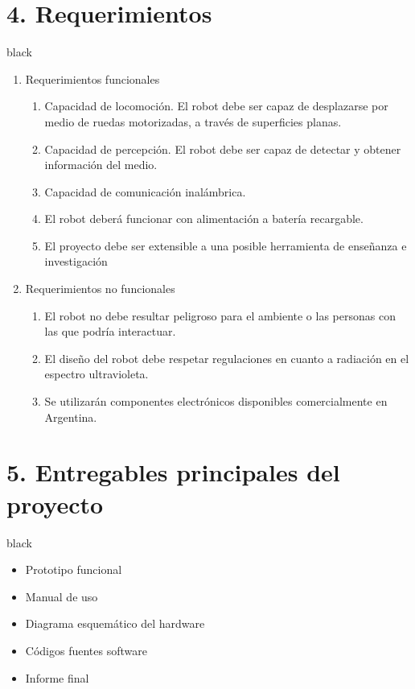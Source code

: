 \documentclass[11pt]{charter}
\begin{document}
\section{4. Requerimientos}
\label{sec:requerimientos}
\begin{consigna}{black}
\vspace{-12mm}
\begin{enumerate}
\item Requerimientos funcionales
	\begin{enumerate}
	\item Capacidad de locomoción.  El robot debe ser capaz de desplazarse por medio de ruedas motorizadas, a través de superficies planas.
	\item Capacidad de percepción. El robot debe ser capaz de detectar y obtener información del medio. 
	\item Capacidad de comunicación inalámbrica.
	\item El robot deberá funcionar con alimentación a batería recargable.
	\item El proyecto debe ser extensible a una posible herramienta de enseñanza e investigación

	\end{enumerate}
\item Requerimientos no funcionales
	\begin{enumerate}
	\item El robot no debe resultar peligroso para el ambiente o las personas con las que podría interactuar.
	\item El diseño del robot debe respetar regulaciones en cuanto a radiación en el espectro ultravioleta.
	\item Se utilizarán componentes electrónicos disponibles comercialmente en Argentina.
	\end{enumerate}
\end{enumerate}
\end{consigna}


\section{5. Entregables principales del proyecto}
\label{sec:entregables}
\vspace{-12mm}
\begin{consigna}{black}
\begin{itemize}
\item Prototipo funcional
\item Manual de uso
\item Diagrama esquemático del hardware
\item Códigos fuentes software
\item Informe final

\end{itemize}
\end{consigna}
\pagebreak
\end{document}
